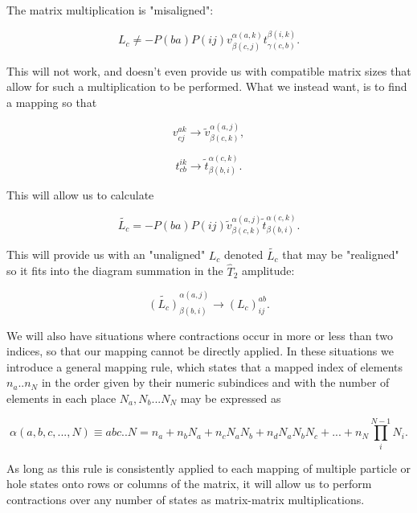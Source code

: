 The matrix multiplication is "misaligned":

\begin{equation}
L_c  \neq -P(ba)P(ij) v^{\alpha(a,k)}_{\beta(c,j)} t^{\beta(i,k)}_{\gamma(c,b)}.
\end{equation}

This will not work, and doesn't even provide us with compatible matrix sizes that allow for such a multiplication to be performed. What we instead want, is to find a mapping so that

\begin{equation}
 v^{ak}_{cj}  \rightarrow \tilde{v}^{\alpha(a,j)}_{\beta(c,k)},
\end{equation}

\begin{equation}
t^{ik}_{cb}  \rightarrow  \tilde{t}^{\alpha(c,k)}_{\beta(b,i)}.
\end{equation}

This will allow us to calculate

\begin{equation}
\tilde{L_c}  = -P(ba)P(ij) \tilde{v}^{\alpha(a,j)}_{\beta(c,k)} \tilde{t}^{\alpha(c,k)}_{\beta(b,i)}.
\end{equation}

This will provide us with an "unaligned" $L_c$ denoted $\tilde{L_c}$ that may be "realigned" so it fits into the diagram summation in the $\hat{T}_2$ amplitude:

\begin{equation}
\tilde{(L_c)}^{\alpha(a,j)}_{\beta(b,i)} \rightarrow {(L_c)}^{ab}_{ij}.
\end{equation}

We will also have situations where contractions occur in more or less than two indices, so that our mapping cannot be directly applied. In these situations we introduce a general mapping rule, which states that a mapped index of elements $n_a .. n_N$ in the order given by their numeric subindices and with the number of elements in each place $N_a, N_b ... N_N$ may be expressed as

\begin{equation}
\alpha(a,b,c,...,N) \equiv abc..N = n_a + n_bN_a + n_cN_aN_b + n_dN_aN_bN_c + ... + n_N \prod_i^{N-1} N_i  .
\end{equation}

As long as this rule is consistently applied to each mapping of multiple particle or hole states onto rows or columns of the matrix, it will allow us to perform contractions over any number of states as matrix-matrix multiplications. 

